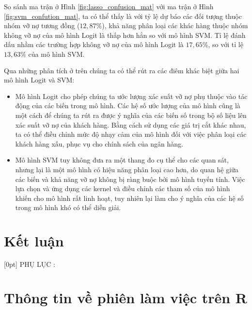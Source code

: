 \documentclass[a4paper]{report}\usepackage[]{graphicx}\usepackage[]{color}
\begin{document}
So sánh ma trận ở Hình \ref{fig:lasso_confusion_mat} với ma trận ở Hình \ref{fig:svm_confution_mat}, ta có thể thấy là với tỷ lệ dự báo các đối tượng thuộc nhóm vỡ nợ tương đồng ($12,87\%$), khả năng phân loại các khác hàng thuộc nhóm không vỡ nợ của mô hình Logit là thấp hơn hẳn so với mô hình SVM. Tỉ lệ đánh dấu nhầm các trường hợp không vỡ nợ của mô hình Logit là $17,65\%$, so với tỉ lệ $13,63\%$ của mô hình SVM.

Qua những phân tích ở trên chúng ta có thể rút ra các điêm khác biệt giữa hai mô hình Logit và SVM:
\begin{itemize}
  \item Mô hình Logit cho phép chúng ta ước lượng xác suất vỡ nợ phụ thuộc vào tác động của các biến trong mô hình. Các hệ số ước lượng của mô hình cũng là một cách để chúng ta rút ra được ý nghĩa của các biến số trong bộ số liệu lên xác suất vỡ nợ của khách hàng. Bằng cách sử dụng các giá trị cắt khác nhau, ta có thể điều chỉnh mức độ nhạy cảm của mô hình đối với việc phân loại các khách hàng xấu, phục vụ cho chính sách của ngân hàng.
  \item Mô hình SVM tuy không đưa ra một thang đo cụ thể cho các quan sát, nhưng lại là một mô hình có hiệu năng phân loại cao hơn, do quan hệ giữa các biến và khả năng vỡ nợ không bị ràng buộc bởi mô hình tuyến tính. Việc lựa chọn và ứng dụng các kernel và điều chỉnh các tham số của mô hình khiến cho mô hình rất linh hoạt, tuy nhiên lại làm cho ý nghĩa của các hệ số trong mô hình khó có thể diễn giải.
\end{itemize}


\chapter{Kết luận}




\appendix
{}[0pt]{\bfseries}
  {\color{blue}PHỤ LỤC \thecontentslabel:\quad}
  {}{\contentspage}
  

\chapter{Thông tin về phiên làm việc trên R}
\end{document}
